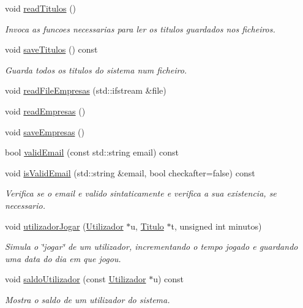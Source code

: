 \begin{DoxyCompactItemize}
void \mbox{\hyperlink{class_sistema_ac9d9a195c580deea2c9126c91d69353e}{read\+Titulos}} ()
\begin{DoxyCompactList}\small\item\em Invoca as funcoes necessarias para ler os titulos guardados nos ficheiros. \end{DoxyCompactList}\item 
void \mbox{\hyperlink{class_sistema_a07ff0877985ee60035abb90a60c458d8}{save\+Titulos}} () const
\begin{DoxyCompactList}\small\item\em Guarda todos os titulos do sistema num ficheiro. \end{DoxyCompactList}\item 
void \mbox{\hyperlink{class_sistema_a00f929e5b2ca1dcc821edb14f9de5a24}{read\+File\+Empresas}} (std\+::ifstream \&file)
\item 
void \mbox{\hyperlink{class_sistema_aeffb6968ea519c472e90dfec1a2a072e}{read\+Empresas}} ()
\item 
void \mbox{\hyperlink{class_sistema_ada4619fbedcb5a07d807545caebd5c57}{save\+Empresas}} ()
\item 
bool \mbox{\hyperlink{class_sistema_a0421323f2c7a5e372b54a40998ed8e69}{valid\+Email}} (const std\+::string email) const
\item 
void \mbox{\hyperlink{class_sistema_ac120f4aecf81933be110233f8dbf74c6}{is\+Valid\+Email}} (std\+::string \&email, bool checkafter=false) const
\begin{DoxyCompactList}\small\item\em Verifica se o email e valido sintaticamente e verifica a sua existencia, se necessario. \end{DoxyCompactList}\item 
void \mbox{\hyperlink{class_sistema_a43e1d500eca075857b1c96c2e2239d55}{utilizador\+Jogar}} (\mbox{\hyperlink{class_utilizador}{Utilizador}} $\ast$u, \mbox{\hyperlink{class_titulo}{Titulo}} $\ast$t, unsigned int minutos)
\begin{DoxyCompactList}\small\item\em Simula o \char`\"{}jogar\char`\"{} de um utilizador, incrementando o tempo jogado e guardando uma data do dia em que jogou. \end{DoxyCompactList}\item 
void \mbox{\hyperlink{class_sistema_aabeb8de1cc79bff9ff04d190ac3754d2}{saldo\+Utilizador}} (const \mbox{\hyperlink{class_utilizador}{Utilizador}} $\ast$u) const
\begin{DoxyCompactList}\small\item\em Mostra o saldo de um utilizador do sistema. \end{DoxyCompactList}\item 

\end{DoxyCompactItemize}
